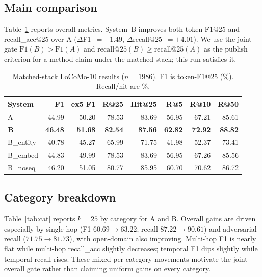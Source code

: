 \documentclass[11pt]{article}
\begin{document}
\subsection{Main comparison}

Table~\ref{tab:main} reports overall metrics.
System~B improves both token-F1@25 and recall\_acc@25 over A
($\Delta$F1~$=+1.49$, $\Delta$recall@$25$~$=+4.01$).
We use the joint gate $\mathrm{F1}(B)>\mathrm{F1}(A)$ and $\mathrm{recall@25}(B)\ge\mathrm{recall@25}(A)$ as the publish criterion for a method claim under the matched stack; this run satisfies it.

\begin{table}[t]
\centering
\small
\caption{Matched-stack LoCoMo-10 results ($n{=}1986$). F1 is token-F1@25 (\%). Recall/hit are \%.}
\label{tab:main}
\begin{tabular}{lrrrrrrr}
\toprule
System & F1 & ex5 F1 & R@25 & Hit@25 & R@5 & R@10 & R@50 \\
\midrule
A & 44.99 & 50.20 & 78.53 & 83.69 & 56.95 & 67.21 & 85.61 \\
\textbf{B} & \textbf{46.48} & \textbf{51.68} & \textbf{82.54} & \textbf{87.56} & \textbf{62.82} & \textbf{72.92} & \textbf{88.82} \\
B\_entity & 40.78 & 45.27 & 65.99 & 71.75 & 41.98 & 52.37 & 73.41 \\
B\_embed & 44.83 & 49.99 & 78.53 & 83.69 & 56.95 & 67.26 & 85.56 \\
B\_noseq & 46.20 & 51.05 & 80.77 & 85.95 & 60.70 & 70.62 & 86.72 \\
\bottomrule
\end{tabular}
\end{table}

\subsection{Category breakdown}

Table~\ref{tab:cat} reports $k{=}25$ by category for A and B.
Overall gains are driven especially by single-hop (F1 $60.69\rightarrow 63.22$; recall $87.22\rightarrow 90.61$) and adversarial recall ($71.75\rightarrow 81.73$), with open-domain also improving.
Multi-hop F1 is nearly flat while multi-hop recall\_acc slightly decreases; temporal F1 dips slightly while temporal recall rises.
These mixed per-category movements motivate the joint overall gate rather than claiming uniform gains on every category.
\end{document}
